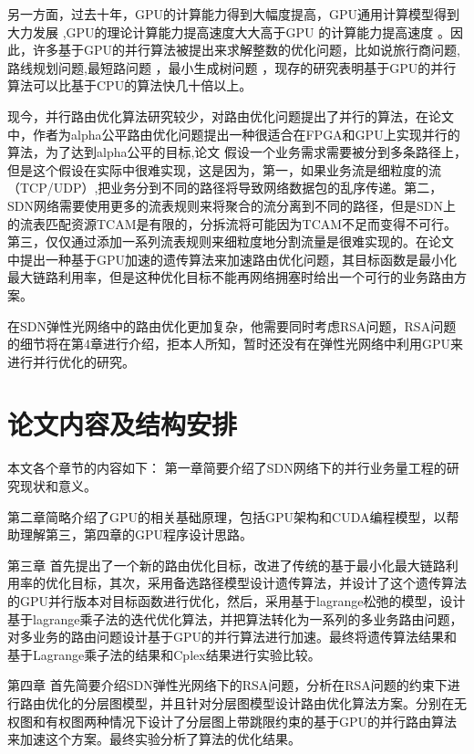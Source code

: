 \documentclass[master]{thesis-uestc}
\begin{document}
另一方面，过去十年，GPU的计算能力得到大幅度提高，GPU通用计算模型得到大力发展 \cite{GPUdeve, CUDA},GPU的理论计算能力提高速度大大高于GPU 的计算能力提高速度 \cite{GPUdeve}。因此，许多基于GPU的并行算法被提出来求解整数的优化问题，比如说旅行商问题\cite{TSP},路线规划问题\cite{VRP},最短路问题 \cite{SSP1, SSP2}，最小生成树问题 \cite{MST}，现存的研究\cite{TSP, VRP, SSP1, SSP2, MST}表明基于GPU的并行算法可以比基于CPU的算法快几十倍以上。

 现今，并行路由优化算法研究较少，\cite{ParaTE1, ParaTE2}对路由优化问题提出了并行的算法，在论文\cite{ParaTE1}中，作者为alpha公平路由优化问题提出一种很适合在FPGA和GPU上实现并行的算法，为了达到alpha公平的目标,论文 \cite {ParaTE1}假设一个业务需求需要被分到多条路径上，但是这个假设在实际中很难实现，这是因为，第一，如果业务流是细粒度的流（TCP/UDP）,把业务分到不同的路径将导致网络数据包的乱序传递。第二，SDN网络需要使用更多的流表规则来将聚合的流分离到不同的路径，但是SDN上的流表匹配资源TCAM是有限的，分拆流将可能因为TCAM不足而变得不可行。第三，仅仅通过添加一系列流表规则来细粒度地分割流量是很难实现的。在论文 \cite{ParaTE2}中提出一种基于GPU加速的遗传算法来加速路由优化问题，其目标函数是最小化最大链路利用率，但是这种优化目标不能再网络拥塞时给出一个可行的业务路由方案。

 在SDN弹性光网络中的路由优化更加复杂，他需要同时考虑RSA问题，RSA问题的细节将在第4章进行介绍，拒本人所知，暂时还没有在弹性光网络中利用GPU来进行并行优化的研究。
\section{论文内容及结构安排}
本文各个章节的内容如下：
    第一章简要介绍了SDN网络下的并行业务量工程的研究现状和意义。

    第二章简略介绍了GPU的相关基础原理，包括GPU架构和CUDA编程模型，以帮助理解第三，第四章的GPU程序设计思路。

    第三章 首先提出了一个新的路由优化目标，改进了传统的基于最小化最大链路利用率的优化目标，其次，采用备选路径模型设计遗传算法，并设计了这个遗传算法的GPU并行版本对目标函数进行优化，然后，采用基于lagrange松弛的模型，设计基于lagrange乘子法的迭代优化算法，并把算法转化为一系列的多业务路由问题，对多业务的路由问题设计基于GPU的并行算法进行加速。最终将遗传算法结果和基于Lagrange乘子法的结果和Cplex结果进行实验比较。

    第四章 首先简要介绍SDN弹性光网络下的RSA问题，分析在RSA问题的约束下进行路由优化的分层图模型，并且针对分层图模型设计路由优化算法方案。分别在无权图和有权图两种情况下设计了分层图上带跳限约束的基于GPU的并行路由算法来加速这个方案。最终实验分析了算法的优化结果。



\end{document}
